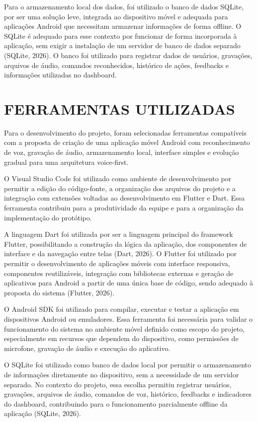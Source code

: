 \documentclass[12pt,oneside,a4paper,brazil,final]{abntex2}
\begin{document}
Para o armazenamento local dos dados, foi utilizado o banco de dados SQLite, por ser uma solução leve, integrada ao dispositivo móvel e adequada para aplicações Android que necessitam armazenar informações de forma offline. O SQLite é adequado para esse contexto por funcionar de forma incorporada à aplicação, sem exigir a instalação de um servidor de banco de dados separado (SQLite, 2026). O banco foi utilizado para registrar dados de usuários, gravações, arquivos de áudio, comandos reconhecidos, histórico de ações, feedbacks e informações utilizadas no dashboard.

\section{FERRAMENTAS UTILIZADAS}

Para o desenvolvimento do projeto, foram selecionadas ferramentas compatíveis com a proposta de criação de uma aplicação móvel Android com reconhecimento de voz, gravação de áudio, armazenamento local, interface simples e evolução gradual para uma arquitetura voice-first.

O Visual Studio Code foi utilizado como ambiente de desenvolvimento por permitir a edição do código-fonte, a organização dos arquivos do projeto e a integração com extensões voltadas ao desenvolvimento em Flutter e Dart. Essa ferramenta contribuiu para a produtividade da equipe e para a organização da implementação do protótipo.

A linguagem Dart foi utilizada por ser a linguagem principal do framework Flutter, possibilitando a construção da lógica da aplicação, dos componentes de interface e da navegação entre telas (Dart, 2026). O Flutter foi utilizado por permitir o desenvolvimento de aplicações móveis com interface responsiva, componentes reutilizáveis, integração com bibliotecas externas e geração de aplicativos para Android a partir de uma única base de código, sendo adequado à proposta do sistema (Flutter, 2026).

O Android SDK foi utilizado para compilar, executar e testar a aplicação em dispositivos Android ou emuladores. Essa ferramenta foi necessária para validar o funcionamento do sistema no ambiente móvel definido como escopo do projeto, especialmente em recursos que dependem do dispositivo, como permissões de microfone, gravação de áudio e execução do aplicativo.

O SQLite foi utilizado como banco de dados local por permitir o armazenamento de informações diretamente no dispositivo, sem a necessidade de um servidor separado. No contexto do projeto, essa escolha permitiu registrar usuários, gravações, arquivos de áudio, comandos de voz, histórico, feedbacks e indicadores do dashboard, contribuindo para o funcionamento parcialmente offline da aplicação (SQLite, 2026).
\end{document}
